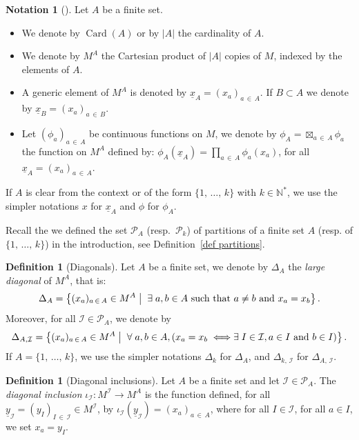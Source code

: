 \documentclass[10pt]{amsart}
\theoremstyle{definition}\newtheorem{defi}[theo]{Definition}\newtheorem{rema}[theo]{Remark}\newtheorem{exam}[theo]{Example}\newtheorem{exem}[theo]{Example}\newtheorem{nota}[theo]{Notation}
\DeclareMathOperator{\card}{Card}
\newcommand{\I}{\mathcal{I}}
\newcommand{\pa}{\mathcal{P}\!}
\newcommand{\N}{\mathbb{N}}
\newcommand{\mvert}{\mathrel{}\middle|\mathrel{}}
\let\oldexists\exists
\renewcommand*{\exists}{\mathrel{\oldexists}}
\let\oldforall\forall
\renewcommand*{\forall}{\mathrel{\oldforall}}
\newenvironment{notas}[1][]{\begin{nota}[#1]}{\end{nota}}\newenvironment{remas}[1][]{\begin{rema}[#1]}{\end{rema}}
\begin{document}
\pagebreak
\begin{notas}\label{ntn product indexed by A}
Let $A$ be a finite set.
\begin{itemize}
\item We denote by $\card(A)$ or by $|A|$ the cardinality of $A$.
\item We denote by $M^A$ the Cartesian product of $|A|$ copies of $M$, indexed by the elements of $A$.
\item A generic element of $M^A$ is denoted by $\underline{x}_A =(x_a)_{a\,\in\,A}$. If $B \subset A$ we denote by $\underline{x}_B =(x_a)_{a\,\in\,B}$.
\item Let $(\phi_a)_{a\,\in\,A}$ be continuous functions on $M$, we denote by $\phi_A = \boxtimes_{a\,\in\,A}\phi_a$ the function on $M^A$ defined by: $\phi_A(\underline{x}_A)=\prod_{a\,\in\,A}\phi_a(x_a)$, for all $\underline{x}_A = (x_a)_{a\,\in \,A}$.
\end{itemize}
If $A$ is clear from the context or of the form $\{1,\,\dots,\,k\}$ with $k \in \N^*$, we use the simpler notations $x$ for $\underline{x}_A$ and $\phi$ for $\phi_A$.
\end{notas}

Recall the we defined the set $\pa_A$ (resp.~$\pa_k$) of partitions of a finite set $A$ (resp. of $\{1,\,\dots,\,k\}$) in the introduction, see Definition~\ref{def partitions}.

\begin{defi}[{Diagonals}]\label{def diagonals}
Let $A$ be a finite set, we denote by $\Delta_A$ the \emph{large diagonal} of $M^A$, that is:
\[
\Delta_A = \left\{(x_a)_{a\,\in\,A}\in M^A \mvert \strut \exists a,b \in A \text{ such that } a \neq b \text{ and } x_a = x_b \right\}.
\]
Moreover, for all $\I \in \pa_A$, we denote by
\[
\Delta_{A,\I} = \left\{(x_a)_{a\,\in\,A}\in M^A \mvert \strut \forall a,b \in A, \left(x_a=x_b \iff \exists I \in \I, a \in I \text{ and } b \in I \right)\right\}.
\]
If $A = \{1,\,\dots,\,k\}$, we use the simpler notations $\Delta_k$ for $\Delta_A$, and $\Delta_{k,\,\I}$ for $\Delta_{A,\,\I}$.
\end{defi}

\begin{defi}[{Diagonal inclusions}]\label{def diagonal inclusions}
Let $A$ be a finite set and let $\I \in \pa_A$. The \emph{diagonal inclusion} $\iota_\I:M^\I\rightarrow M^A$ is the function defined, for all $\underline{y}_\I= (y_I)_{I\,\in\,\I} \in M^\I$, by $\iota_\I(\underline{y}_\I)= (x_a)_{a\,\in\,A}$, where for all $I \in \I$, for all $a \in I$, we set $x_a = y_I$.
\end{defi}
\end{document}
